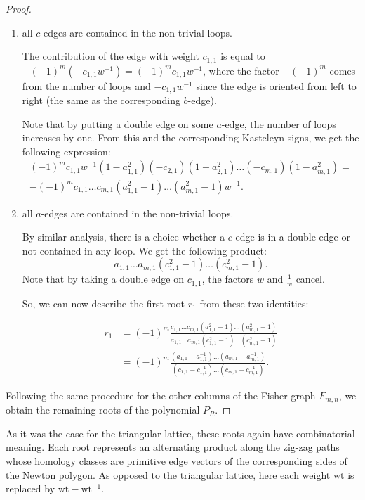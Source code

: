 \documentclass[12pt,a4paper]{article}
\theoremstyle{definition}
\def\\deg{\mathrm {\deg}}
\def\wt{\mathrm {wt}}
\begin{document}
\begin{proof}
    \begin{enumerate}
        \item all $c$-edges are contained in the non-trivial loops.

        The contribution of the edge with weight $c_{1,1}$ is equal to  $-(-1)^m (-c_{1,1}w^{-1}) = (-1)^m c_{1,1}w^{-1}$, where the factor $-(-1)^m$ comes from the number of loops and $-c_{1,1}w^{-1}$ since the edge is oriented from left to right (the same as the corresponding $b$-edge). 
        
        Note that by putting a double edge on some $a$-edge, the number of loops increases by one. From this and the corresponding Kasteleyn signs, we get the following expression: 
        \begin{align*}
            (-1)^mc_{1,1}w^{-1}(1 - a_{1,1}^2)(-c_{2,1})(1 - a_{2,1}^2) \dots (-c_{m,1})(1 - a_{m,1}^2) =\\
            -(-1)^mc_{1,1} \dots c_{m,1} (a_{1,1}^2-1) \dots (a_{m,1}^2-1)w^{-1}.
        \end{align*}
        \item all $a$-edges are contained in the non-trivial loops.

        By similar analysis, there is a choice whether a $c$-edge is in a double edge or not contained in any loop. We get the following product:
        \[a_{1,1} \dots a_{m,1} (c_{1,1}^2-1) \dots (c_{m,1}^2-1).\]
        Note that by taking a double edge on $c_{1,1}$, the factors $w$ and $\frac{1}{w}$ cancel.

        So, we can now describe the first root $r_1$ from these two identities:

        \begin{align*}
            r_1 &= (-1)^m \frac{c_{1,1} \dots c_{m,1} (a_{1,1}^2-1) \dots (a_{m,1}^2-1)}{a_{1,1} \dots a_{m,1} (c_{1,1}^2-1) \dots (c_{m,1}^2-1)} \\
            &= (-1)^m \frac{(a_{1,1}-a_{1,1}^{-1}) \dots (a_{m,1}-a_{m,1}^{-1})}{ (c_{1,1}-c_{1,1}^{-1}) \dots (c_{m,1}-c_{m,1}^{-1})}.
        \end{align*}
    \end{enumerate}

    Following the same procedure for the other columns of the Fisher graph $F_{m,n}$, we obtain the remaining roots of the polynomial $P_R$.
\end{proof} 

As it was the case for the triangular lattice, these roots again have combinatorial meaning. Each root represents an alternating product along the zig-zag paths whose homology classes are primitive edge vectors of the corresponding sides of the Newton polygon. As opposed to the triangular lattice, here each weight $\wt$ is replaced by $\wt - \wt^{-1}$. 
\end{document}
